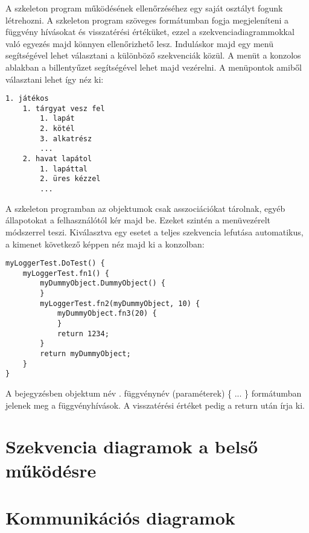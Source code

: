 A szkeleton program működésének ellenőrzéséhez egy saját osztályt fogunk létrehozni. A szkeleton program szöveges formátumban fogja megjeleníteni a függvény hívásokat és visszatérési értéküket, ezzel a szekvenciadiagrammokkal való egyezés majd könnyen ellenőrizhető lesz. Induláskor majd egy menü segítségével lehet választani a különböző szekvenciák közül. A menüt a konzolos ablakban a billentyűzet segítségével lehet majd vezérelni. A menüpontok amiből választani lehet így néz ki:
\begin{Verbatim}[samepage=true]
1. játékos
	1. tárgyat vesz fel
		1. lapát
		2. kötél
		3. alkatrész
		...
	2. havat lapátol
		1. lapáttal
		2. üres kézzel
		...
\end{Verbatim}
A szkeleton programban az objektumok csak asszociációkat tárolnak, egyéb állapotokat a felhasználótól kér majd be. Ezeket szintén a menüvezérelt módszerrel teszi. Kiválasztva egy esetet a teljes szekvencia lefutása automatikus, a kimenet következő képpen néz majd ki a konzolban:
\begin{Verbatim}[samepage=true]
myLoggerTest.DoTest() {
    myLoggerTest.fn1() {
        myDummyObject.DummyObject() {
        }
        myLoggerTest.fn2(myDummyObject, 10) {
            myDummyObject.fn3(20) {
            }
            return 1234;
        }
        return myDummyObject;
    }
}
\end{Verbatim}
A bejegyzésben objektum név . függvénynév (paraméterek) \{ ... \} formátumban jelenek meg a függvényhívások. A visszatérési értéket pedig a return után írja ki.

\section{Szekvencia diagramok a belső működésre}

\section{Kommunikációs diagramok}
